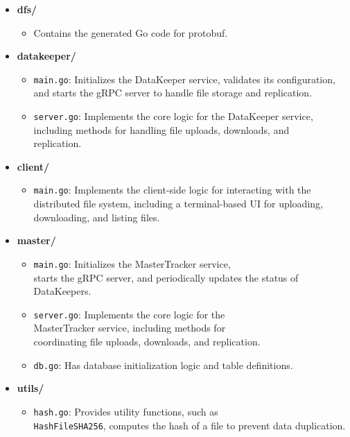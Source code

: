 \documentclass[a4paper,14pt]{extarticle}
\begin{document}
\begin{itemize}

    \item \textbf{dfs/}
    \begin{itemize}
        \item Contains the generated Go code for protobuf.
    \end{itemize}

    \item \textbf{datakeeper/}
    \begin{itemize}
        \item \texttt{main.go}: Initializes the DataKeeper service, validates its configuration, and starts the gRPC server to handle file storage and replication.
        \item \texttt{server.go}: Implements the core logic for the DataKeeper service, including methods for handling file uploads, downloads, and 
        \\ replication.
    \end{itemize}

\newpage

    \item \textbf{client/}
    \begin{itemize}
        \item \texttt{main.go}: Implements the client-side logic for interacting with the distributed file system, including a terminal-based UI for uploading, downloading, and listing files.
    \end{itemize}

    \item \textbf{master/}
    \begin{itemize}
        \item \texttt{main.go}: Initializes the MasterTracker service,
          \\ starts the gRPC server, and periodically updates the status of DataKeepers.
        \item \texttt{server.go}: Implements the core logic for the 
          \\ MasterTracker service, including methods for 
          \\ coordinating file uploads, downloads, and replication.
        \item \texttt{db.go}: Has database initialization logic and table definitions.
    \end{itemize}

    \item \textbf{utils/}
    \begin{itemize}
        \item \texttt{hash.go}: Provides utility functions, such as 
          \\ \texttt{HashFileSHA256},
        computes the hash of a file to prevent data duplication.
    \end{itemize}

\end{itemize}
\end{document}
